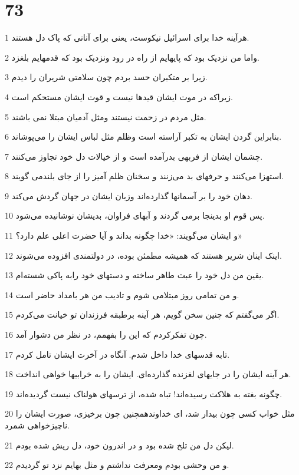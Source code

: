 \chapter{73}

\par 1 هرآینه خدا برای اسرائیل نیکوست، یعنی برای آنانی که پاک دل هستند.
\par 2 واما من نزدیک بود که پایهایم از راه در رود ونزدیک بود که قدمهایم بلغزد.
\par 3 زیرا بر متکبران حسد بردم چون سلامتی شریران را دیدم.
\par 4 زیراکه در موت ایشان قیدها نیست و قوت ایشان مستحکم است.
\par 5 مثل مردم در زحمت نیستند ومثل آدمیان مبتلا نمی باشند.
\par 6 بنابراین گردن ایشان به تکبر آراسته است وظلم مثل لباس ایشان را می‌پوشاند.
\par 7 چشمان ایشان از فربهی بدر‌آمده است و از خیالات دل خود تجاوز می‌کنند.
\par 8 استهزا می‌کنند و حرفهای بد می‌زنند و سخنان ظلم آمیز را از جای بلندمی گویند.
\par 9 دهان خود را بر آسمانها گذارده‌اند وزبان ایشان در جهان گردش می‌کند.
\par 10 پس قوم او بدینجا برمی گردند و آبهای فراوان، بدیشان نوشانیده می‌شود.
\par 11 و ایشان می‌گویند: «خدا چگونه بداند و آیا حضرت اعلی علم دارد؟»
\par 12 اینک اینان شریر هستند که همیشه مطمئن بوده، در دولتمندی افزوده می‌شوند.
\par 13 یقین من دل خود را عبث طاهر ساخته و دستهای خود رابه پاکی شسته‌ام.
\par 14 و من تمامی روز مبتلامی شوم و تادیب من هر بامداد حاضر است.
\par 15 اگر می‌گفتم که چنین سخن گویم، هر آینه برطبقه فرزندان تو خیانت می‌کردم.
\par 16 چون تفکرکردم که این را بفهمم، در نظر من دشوار آمد.
\par 17 تابه قدسهای خدا داخل شدم. آنگاه در آخرت ایشان تامل کردم.
\par 18 هر آینه ایشان را در جایهای لغزنده گذارده‌ای. ایشان را به خرابیها خواهی انداخت.
\par 19 چگونه بغته به هلاکت رسیده‌اند! تباه شده، از ترسهای هولناک نیست گردیده‌اند.
\par 20 مثل خواب کسی چون بیدار شد، ای خداوندهمچنین چون برخیزی، صورت ایشان را ناچیزخواهی شمرد.
\par 21 لیکن دل من تلخ شده بود و در اندرون خود، دل ریش شده بودم.
\par 22 و من وحشی بودم ومعرفت نداشتم و مثل بهایم نزد تو گردیدم.
